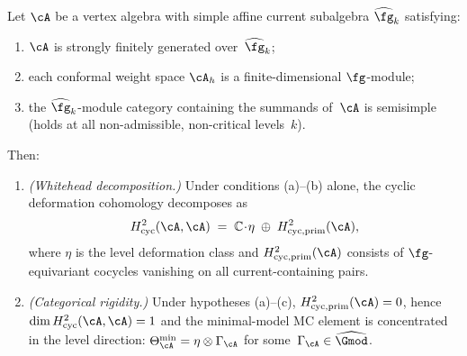 \begin{theorem}
\label{thm:cyclic-rigidity-generic}
Let\/ $\cA$ be a vertex algebra with simple affine current
subalgebra\/ $\widehat{\fg}_k$ satisfying:
\begin{enumerate}[label=\textup{(\alph*)}]
\item $\cA$ is strongly finitely generated
  over\/~$\widehat{\fg}_k$;
\item each conformal weight space $\cA_h$ is a
  finite-dimensional\/ $\fg$-module;
\item the\/ $\widehat{\fg}_k$-module category containing the
  summands of\/~$\cA$ is semisimple
  \textup{(}holds at all non-admissible, non-critical
  levels~$k$\textup{)}.
\end{enumerate}
Then:
\begin{enumerate}[label=\textup{(\roman*)}]
\item \emph{\textup{(}Whitehead decomposition.\textup{)}}
  Under conditions \textup{(a)--(b)} alone, the cyclic
  deformation cohomology decomposes as
  \begin{equation}\label{eq:whitehead-decomposition}
  H^2_{\mathrm{cyc}}(\cA, \cA)
  \;=\;
  \mathbb{C}\!\cdot\!\eta
  \;\oplus\;
  H^2_{\mathrm{cyc,prim}}(\cA),
  \end{equation}
  where\/ $\eta$ is the level deformation class and\/
  $H^2_{\mathrm{cyc,prim}}(\cA)$ consists of\/
  $\fg$-equivariant cocycles vanishing on all
  current-containing pairs.
\item \emph{\textup{(}Categorical rigidity.\textup{)}}
  Under hypotheses \textup{(a)--(c)},
  $H^2_{\mathrm{cyc,prim}}(\cA) = 0$,
  hence $\dim H^2_{\mathrm{cyc}}(\cA,\cA) = 1$
  and the minimal-model MC element is concentrated in the
  level direction:
  $\Theta_{\cA}^{\min} = \eta \otimes \Gamma_{\cA}$
  for some\/~$\Gamma_{\cA}\in\widehat{\Gmod}$.
\end{enumerate}
\end{theorem}

